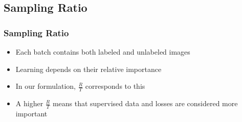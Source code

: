 \subsection{Sampling Ratio}
\begin{frame}
	\frametitle{Sampling Ratio}
	\begin{itemize}
		\item Each batch contains both labeled and unlabeled images
		\item Learning depends on their relative importance
		\item In our formulation, $\frac{R}{T}$ corresponds to this
		\item A higher $\frac{R}{T}$ means that supervised data and losses are considered more
			important
	\end{itemize}
\end{frame}

